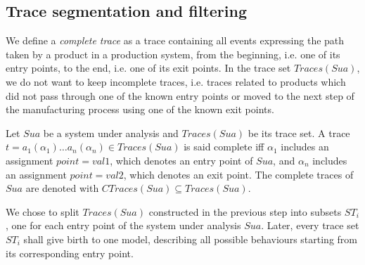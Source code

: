 \subsection{Trace segmentation and filtering}
\label{sec:modelinf:prodsystems:segmentation}

We define a \textit{complete trace} as a trace containing all
events expressing the path taken by a product in a production
system, from the beginning, i.e. one of its entry points, to the
end, i.e. one of its exit points. In the trace set $Traces(Sua)$,
we do not want to keep incomplete traces, i.e. traces related to
products which did not pass through one of the known entry points
or moved to the next step of the manufacturing process using one
of the known exit points.

\begin{definition}
Let $\mathit{Sua}$ be a system under analysis and $Traces({Sua})$
be its trace set. A trace $t=a_1(\alpha_1) \dots a_n(\alpha_n) \in
Traces({Sua})$ is said complete iff $\alpha_1$ includes an
assignment $point=val1$, which denotes an entry point of
$\mathit{Sua}$, and $\alpha_n$ includes an assignment
$point=val2$, which denotes an exit point.  The complete traces
of $\mathit{Sua}$ are denoted with $CTraces({Sua}) \subseteq
Traces({Sua})$.
\end{definition}

We chose to split $Traces(Sua)$ constructed in the previous step
into subsets $ST_i$, one for each entry point of the system under
analysis $Sua$. Later, every trace set $ST_i$ shall give birth to
one model, describing all possible behaviours starting from its
corresponding entry point.

